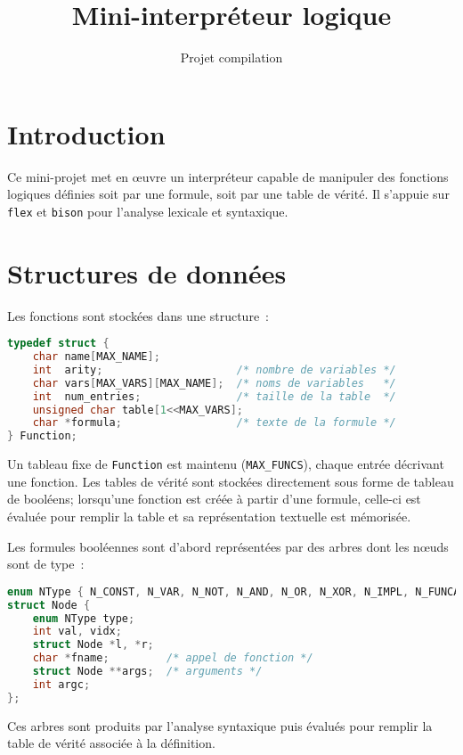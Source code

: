 \documentclass[a4paper,11pt]{article}
\title{Mini-interpréteur logique}
\author{Projet compilation}
\date{}
\begin{document}
\maketitle
\section*{Introduction}
Ce mini-projet met en \oe uvre un interpréteur capable de manipuler des fonctions logiques définies soit par une formule, soit par une table de vérité.  Il s'appuie sur \texttt{flex} et \texttt{bison} pour l'analyse lexicale et syntaxique.

\section*{Structures de données}
Les fonctions sont stockées dans une structure~:\newline
\begin{lstlisting}[language=C]
typedef struct {
    char name[MAX_NAME];
    int  arity;                     /* nombre de variables */
    char vars[MAX_VARS][MAX_NAME];  /* noms de variables   */
    int  num_entries;               /* taille de la table  */
    unsigned char table[1<<MAX_VARS];
    char *formula;                  /* texte de la formule */
} Function;
\end{lstlisting}
Un tableau fixe de \verb|Function| est maintenu (\verb|MAX_FUNCS|), chaque entrée décrivant une fonction.  Les tables de vérité sont stockées directement sous forme de tableau de booléens; lorsqu'une fonction est créée à partir d'une formule, celle-ci est évaluée pour remplir la table et sa représentation textuelle est mémorisée.

Les formules booléennes sont d'abord représentées par des arbres dont les nœuds sont de type~:\newline
\begin{lstlisting}[language=C]
enum NType { N_CONST, N_VAR, N_NOT, N_AND, N_OR, N_XOR, N_IMPL, N_FUNCALL };
struct Node {
    enum NType type;
    int val, vidx;
    struct Node *l, *r;
    char *fname;         /* appel de fonction */
    struct Node **args;  /* arguments */
    int argc;
};
\end{lstlisting}
Ces arbres sont produits par l'analyse syntaxique puis évalués pour remplir la table de vérité associée à la définition.
\end{document}
